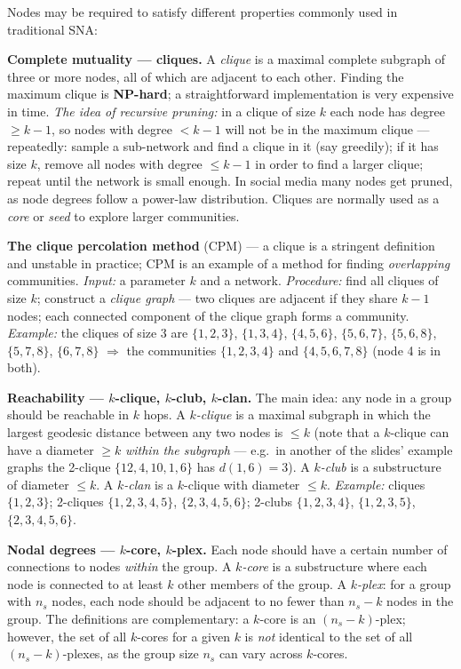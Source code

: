 \documentclass[11pt,a4paper]{article}
\theoremstyle{definition}
\begin{document}
\begin{defbox}
Nodes may be required to satisfy different properties commonly used in traditional SNA:

\textbf{Complete mutuality --- cliques.} A \emph{clique} is a maximal complete subgraph of three or
more nodes, all of which are adjacent to each other. Finding the maximum clique is \textbf{NP-hard};
a straightforward implementation is very expensive in time. \emph{The idea of recursive pruning:} in a
clique of size $k$ each node has degree $\ge k-1$, so nodes with degree $<k-1$ will not be in the
maximum clique --- repeatedly: sample a sub-network and find a clique in it (say greedily); if it has
size $k$, remove all nodes with degree $\le k-1$ in order to find a larger clique; repeat until the
network is small enough. In social media many nodes get pruned, as node degrees follow a power-law
distribution. Cliques are normally used as a \emph{core} or \emph{seed} to explore larger communities.

\textbf{The clique percolation method} (CPM) --- a clique is a stringent definition and unstable in
practice; CPM is an example of a method for finding \emph{overlapping} communities. \emph{Input:} a
parameter $k$ and a network. \emph{Procedure:} find all cliques of size $k$; construct a \emph{clique
graph} --- two cliques are adjacent if they share $k-1$ nodes; each connected component of the clique
graph forms a community.
\emph{Example:} the cliques of size 3 are $\{1,2,3\}$, $\{1,3,4\}$, $\{4,5,6\}$, $\{5,6,7\}$,
$\{5,6,8\}$, $\{5,7,8\}$, $\{6,7,8\}$ $\Rightarrow$ the communities $\{1,2,3,4\}$ and
$\{4,5,6,7,8\}$ (node 4 is in both).

\textbf{Reachability --- $k$-clique, $k$-club, $k$-clan.} The main idea: any node in a group should be
reachable in $k$ hops. A \emph{$k$-clique} is a maximal subgraph in which the largest geodesic
distance between any two nodes is $\le k$ (note that a $k$-clique can have a diameter $\ge k$
\emph{within the subgraph} --- e.g.\ in another of the slides' example graphs the 2-clique
$\{12,4,10,1,6\}$ has $d(1,6)=3$). A
\emph{$k$-club} is a substructure of diameter $\le k$. A \emph{$k$-clan} is a $k$-clique with diameter
$\le k$.
\emph{Example:} cliques $\{1,2,3\}$; 2-cliques $\{1,2,3,4,5\}$, $\{2,3,4,5,6\}$; 2-clubs
$\{1,2,3,4\}$, $\{1,2,3,5\}$, $\{2,3,4,5,6\}$.

\textbf{Nodal degrees --- $k$-core, $k$-plex.} Each node should have a certain number of connections to
nodes \emph{within} the group. A \emph{$k$-core} is a substructure where each node is connected to at
least $k$ other members of the group. A \emph{$k$-plex}: for a group with $n_s$ nodes, each node should
be adjacent to no fewer than $n_s-k$ nodes in the group. The definitions are complementary: a $k$-core
is an $(n_s-k)$-plex; however, the set of all $k$-cores for a given $k$ is \emph{not} identical to the
set of all $(n_s-k)$-plexes, as the group size $n_s$ can vary across $k$-cores.


\end{defbox}
\end{document}
